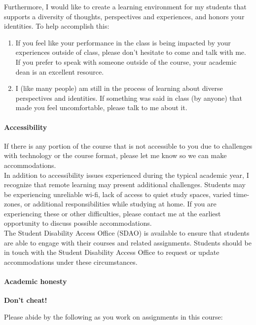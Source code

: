 \documentclass[11pt]{article}
\begin{document}
Furthermore, I would like to create a learning environment for my students that supports a diversity of thoughts, perspectives and experiences, and honors your identities. To help accomplish this:

\begin{enumerate}
\item If you feel like your performance in the class is being impacted by your experiences outside of class, please don’t hesitate to come and talk with me. If you prefer to speak with someone outside of the course, your academic dean is an excellent resource.
\item   I (like many people) am still in the process of learning about diverse perspectives and identities. If something was said in class (by anyone) that made you feel uncomfortable, please talk to me about it.
\end{enumerate}

\paragraph{Accessibility}

If there is any portion of the course that is not accessible to you due to challenges with technology or the course format, please let me know so we can make accommodations.\\

In addition to accessibility issues experienced during the typical academic year, I recognize that remote learning may present additional challenges. Students may be experiencing unreliable wi-fi, lack of access to quiet study spaces, varied time-zones, or additional responsibilities while studying at home. If you are experiencing these or other difficulties, please contact me at the earliest opportunity to discuss possible accommodations. \\

The Student Disability Access Office (SDAO) is available to ensure that students are able to engage with their courses and related assignments. Students should be in touch with the Student Disability Access Office to request or update accommodations under these circumstances. 

\paragraph{Academic honesty}

\textbf{Don’t cheat!}

Please abide by the following as you work on assignments in this course:
\end{document}
